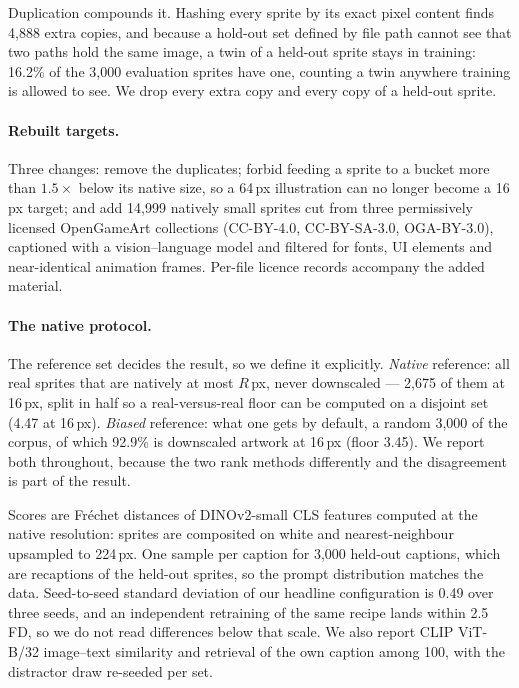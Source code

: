 \documentclass[10pt,twocolumn,letterpaper]{article}
\begin{document}
Duplication compounds it. Hashing every sprite by its exact pixel content finds 4{,}888 extra copies, and because a
hold-out set defined by file path cannot see that two paths hold the same image, a twin of a held-out sprite stays in
training: 16.2\%
of the 3{,}000 evaluation sprites have one, counting a twin anywhere training is allowed to see. We drop every extra
copy and every copy of a held-out sprite.

\paragraph{Rebuilt targets.}
Three changes: remove the duplicates; forbid feeding a sprite to a bucket more than $1.5\times$ below its native size,
so a 64\,px illustration can no longer become a 16\,px target; and add 14{,}999 natively small sprites cut from three
permissively licensed OpenGameArt collections (CC-BY-4.0, CC-BY-SA-3.0, OGA-BY-3.0), captioned with a
vision--language model and filtered for fonts, UI elements and near-identical animation frames. Per-file licence
records accompany the added material.

\paragraph{The native protocol.}
The reference set decides the result, so we define it explicitly. \emph{Native} reference: all real sprites that are
natively at most $R$\,px, never downscaled --- 2{,}675 of them at 16\,px, split in half so a real-versus-real floor can
be computed on a disjoint set (4.47 at 16\,px). \emph{Biased} reference: what one gets by default, a random 3{,}000 of
the corpus, of which 92.9\% is downscaled artwork at 16\,px (floor 3.45). We report both throughout, because the two rank
methods differently and the disagreement is part of the result.

Scores are Fréchet distances of DINOv2-small CLS features \cite{Oquab2023,Stein2023} computed at the native
resolution: sprites are composited on white and nearest-neighbour upsampled to 224\,px. One sample per caption for
3{,}000 held-out captions, which are recaptions of the held-out sprites, so the prompt distribution matches the data.
Seed-to-seed standard deviation of our headline configuration is 0.49 over three seeds, and an independent retraining
of the same recipe lands within 2.5 FD, so we do not read differences below that scale. We also report CLIP ViT-B/32
image--text similarity and retrieval of the own caption among 100, with the distractor draw re-seeded per set.
\end{document}
